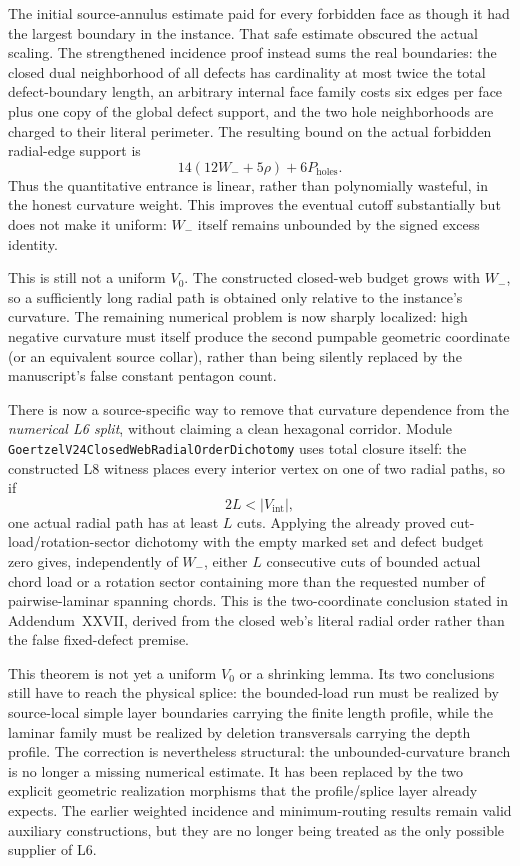 \documentclass[11pt]{article}
\theoremstyle{definition}
\begin{document}
The initial source-annulus estimate paid for every forbidden face as though it
had the largest boundary in the instance.  That safe estimate obscured the
actual scaling.  The strengthened incidence proof instead sums the real
boundaries: the closed dual neighborhood of all defects has cardinality at
most twice the total defect-boundary length, an arbitrary internal face family
costs six edges per face plus one copy of the global defect support, and the
two hole neighborhoods are charged to their literal perimeter.  The resulting
bound on the actual forbidden radial-edge support is
\[
  14(12W_-+5\rho)+6P_{\mathrm{holes}}.
\]
Thus the quantitative entrance is linear, rather than polynomially wasteful,
in the honest curvature weight.  This improves the eventual cutoff
substantially but does not make it uniform: $W_-$ itself remains unbounded by
the signed excess identity.

This is still not a uniform $V_0$.  The constructed closed-web budget grows
with $W_-$, so a sufficiently long radial path is obtained only relative to
the instance's curvature.  The remaining numerical problem is now sharply
localized: high negative curvature must itself produce the second pumpable
geometric coordinate (or an equivalent source collar), rather than being
silently replaced by the manuscript's false constant pentagon count.

There is now a source-specific way to remove that curvature dependence from
the \emph{numerical L6 split}, without claiming a clean hexagonal corridor.
Module
\texttt{GoertzelV24ClosedWebRadialOrderDichotomy} uses total closure itself:
the constructed L8 witness places every interior vertex on one of two radial
paths, so if
\[
  2L < |V_{\mathrm{int}}|,
\]
one actual radial path has at least $L$ cuts.  Applying the already proved
cut-load/rotation-sector dichotomy with the empty marked set and defect budget
zero gives, independently of $W_-$, either $L$ consecutive cuts of bounded
actual chord load or a rotation sector containing more than the requested
number of pairwise-laminar spanning chords.  This is the two-coordinate
conclusion stated in Addendum~XXVII, derived from the closed web's literal
radial order rather than the false fixed-defect premise.

This theorem is not yet a uniform $V_0$ or a shrinking lemma.  Its two
conclusions still have to reach the physical splice: the bounded-load run must
be realized by source-local simple layer boundaries carrying the finite length
profile, while the laminar family must be realized by deletion transversals
carrying the depth profile.  The correction is nevertheless structural: the
unbounded-curvature branch is no longer a missing numerical estimate.  It has
been replaced by the two explicit geometric realization morphisms that the
profile/splice layer already expects.  The earlier weighted incidence and
minimum-routing results remain valid auxiliary constructions, but they are no
longer being treated as the only possible supplier of L6.
\end{document}
